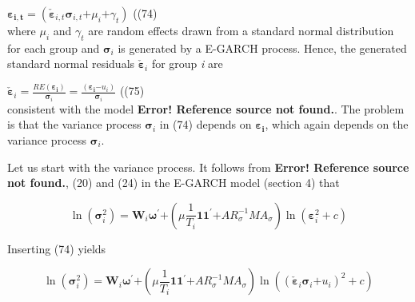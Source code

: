 \documentclass{article}
\begin{document}
  

$\mathbf{\varepsilon}_{\mathbf{i,t}}\mathbf{=}\left( {\check{\mathbf{\varepsilon}}}_{i,t}\mathbf{\sigma}_{i,t}\mathbf{+}\mu_{i}\mathbf{+}\gamma_{t} \right)$ ((74) \\


where $\mu_{i}$ and $\gamma_{t}$ are random effects drawn from a
standard normal distribution for each group and $\mathbf{\sigma}_{i}$
is generated by a E-GARCH process. Hence, the generated standard normal
residuals ${\check{\mathbf{\varepsilon}}}_{i}$ for group \emph{i} are



  

${\check{\mathbf{\varepsilon}}}_{i} = \frac{RE\left( \mathbf{\varepsilon}_{\mathbf{i}} \right)}{\mathbf{\sigma}_{i}} = \frac{\left( \mathbf{\varepsilon}_{\mathbf{i}}\mathbf{-}u_{i} \right)}{\mathbf{\sigma}_{i}}$ ((75) \\


consistent with the model \textbf{Error! Reference source not found.}.
The problem is that the variance process $\mathbf{\sigma}_{i}$ in (74)
depends on $\mathbf{\varepsilon}_{\mathbf{i}}$, which again depends on
the variance process $\mathbf{\sigma}_{i}$.

Let us start with the variance process. It follows from \textbf{Error!
Reference source not found.}, (20) and (24) in the E-GARCH model
(section 4) that



  

\begin{equation}
\ln\left( \mathbf{\sigma}_{i}^{2} \right) = \mathbf{W}_{i}\mathbf{\omega}^{\mathbf{'}}\mathbf{+}\left( \mu\frac{1}{T_{i}}\mathbf{1}\mathbf{1}^{\mathbf{'}}\mathbf{+}{AR}_{\sigma}^{- 1}MA_{\sigma} \right)\ln\left( \mathbf{\varepsilon}_{i}^{2} + c \right)
\label{eq:76}
\end{equation}


Inserting (74) yields



  

\begin{equation}
\ln\left( \mathbf{\sigma}_{i}^{2} \right) = \mathbf{W}_{i}\mathbf{\omega}^{\mathbf{'}}\mathbf{+}\left( \mu\frac{1}{T_{i}}\mathbf{1}\mathbf{1}^{\mathbf{'}}\mathbf{+}{AR}_{\sigma}^{- 1}MA_{\sigma} \right)\ln\left( \left( {\check{\mathbf{\varepsilon}}}_{i}\mathbf{\sigma}_{i}\mathbf{+}u_{i} \right)^{2} + c \right)
\label{eq:77}
\end{equation}
\end{document}
